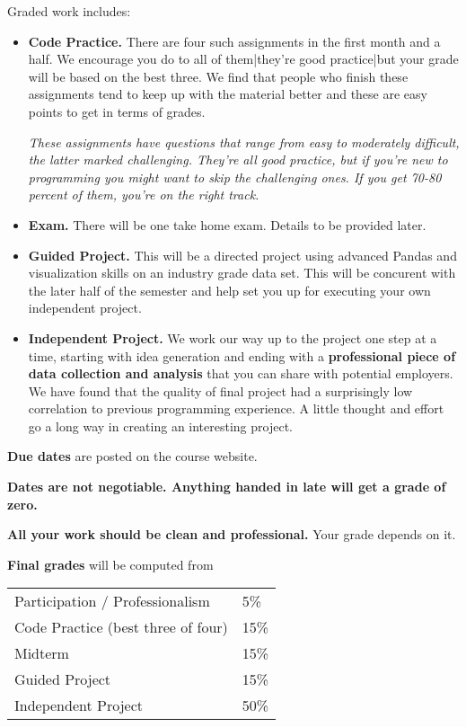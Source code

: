 Graded work includes:
\begin{itemize}

\item {\bf Code Practice.\/}
There are four such assignments in the first month and a half. We encourage you do to all of them|they're good practice|but your grade will be based on the best three. We find that people who finish these assignments tend to keep up with the material better and these are easy points to get in terms of grades.

{\it These assignments have questions that range from easy to moderately difficult,
the latter marked {\it challenging\/}.
They're all good practice, but if you're new to programming you
might want to skip the challenging ones.
If you get 70-80 percent of them, you're on the right track. \/}

\item {\bf Exam.\/}
There will be one take home exam. Details to be provided later. 


\item {\bf Guided Project.\/}
This will be a directed project using advanced Pandas and visualization skills on an industry grade data set. This will be concurent with the later half of the semester and help set you up for executing your own independent project. 

\item {\bf Independent Project.\/}
We work our way up to the project one step at a time, starting with idea generation and ending
with a {\bf professional piece of data collection and analysis\/}
that you can share with potential employers. We have found that the quality
of final project had a surprisingly low correlation to previous programming experience. A little thought and
effort go a long way in creating an interesting project.

\end{itemize}


{\bf Due dates} are posted on the course website.

{\bf Dates are not negotiable.
Anything handed in late will get a grade of zero.\/}

{\bf All your work should be clean and professional.}  Your grade depends on it.

{\bf Final grades\/} will be computed from
\begin{center}
\begin{tabular}{ll}
Participation / Professionalism & 5\% \\
Code Practice (best three of four) & 15\% \\
Midterm       & 15\% \\
Guided Project        & 15\% \\
Independent Project     & 50\% \\
\end{tabular}
\end{center}

